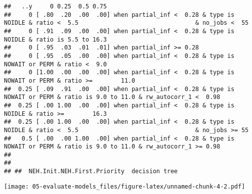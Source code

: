 \documentclass[
]{article}
\begin{document}
\begin{verbatim}
##   ..y     0 0.25  0.5 0.75                                                                                                                  
##     0 [ .80  .20  .00  .00] when partial_inf <  0.28 & type is         NOIDLE & ratio <  5.5                                 & no_jobs <  55
##     0 [ .91  .09  .00  .00] when partial_inf <  0.28 & type is         NOIDLE & ratio is 5.5 to 16.3                                        
##     0 [ .95  .03  .01  .01] when partial_inf >= 0.28                                                                                        
##     0 [ .95  .05  .00  .00] when partial_inf <  0.28 & type is NOWAIT or PERM & ratio <  9.0                                                
##     0 [1.00  .00  .00  .00] when partial_inf <  0.28 & type is NOWAIT or PERM & ratio >=        11.0                                        
##  0.25 [ .09  .91  .00  .00] when partial_inf <  0.28 & type is NOWAIT or PERM & ratio is 9.0 to 11.0 & rw_autocorr_1 <  0.98                
##  0.25 [ .00 1.00  .00  .00] when partial_inf <  0.28 & type is         NOIDLE & ratio >=        16.3                                        
##  0.25 [ .00 1.00  .00  .00] when partial_inf <  0.28 & type is         NOIDLE & ratio <  5.5                                 & no_jobs >= 55
##   0.5 [ .00  .00 1.00  .00] when partial_inf <  0.28 & type is NOWAIT or PERM & ratio is 9.0 to 11.0 & rw_autocorr_1 >= 0.98                
## 
## 
## ##  NEH.Init.NEH.First.Priority  decision tree
\end{verbatim}

\texttt{[image: 05-evaluate-models\_files/figure-latex/unnamed-chunk-4-2.pdf]}
\end{document}
